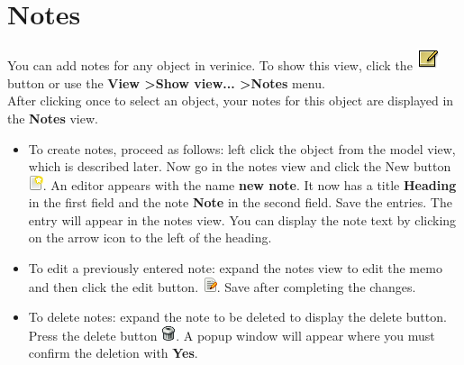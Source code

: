 \documentclass[a4paper,10pt]{book}
\begin{document}
\section{Notes}
You can add notes for any object in verinice. To show this view, click the \includegraphics[height=2ex]{Icon/Notizen.png}
button or use the \textbf{View \textgreater Show view... \textgreater Notes} menu.
\newline\\
After clicking once to select an object, your notes for this object are displayed in the \textbf{Notes} view.
\begin{itemize}
 \item To create notes, proceed as follows: left click the object from the model view, which is described later.
Now go in the notes view and click the New button \includegraphics[height=2ex]{Icon/Oeffnen.png}. An editor appears with the name \textbf{new note}.
It now has a title \textbf{Heading} in the first field and the note \textbf{Note} in the second field.
Save the entries. The entry will appear in the notes view. You can display the note text by clicking on the arrow icon to the left of the heading.
\item To edit a previously entered note: expand the notes view to edit the memo and then click the edit button. \includegraphics[height=2ex]{Icon/Edit.png}.
Save after completing the changes.
\item To delete notes: expand the note to be deleted to display the delete button.
Press the delete button \includegraphics[height=2ex]{Icon/Delete.png}.
A popup window will appear where you must confirm the deletion with \textbf{Yes}.
\end{itemize}
\end{document}
